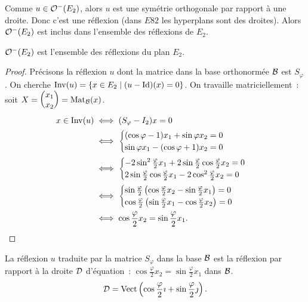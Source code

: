 Comme \(u \in \mathcal{O}^{-}\!\left(E_2\right)\), alors \(u\) est une symétrie orthogonale par 
rapport à une droite. Donc c'est une réflexion (dans \(E82\) les hyperplans 
sont des droites). Alors \(\mathcal{O}^{-}\!\left(E_2\right)\) est inclus dans l'ensemble des 
réflexions de \(E_2\).

\begin{theo}
  \(\mathcal{O}^{-}\!\left(E_2\right)\) est l'ensemble des réflexions du plan \(E_2\).
\end{theo}
\begin{proof}
  Précisons la réflexion \(u\) dont la matrice dans la base orthonormée 
  \(\mathcal{B}\) est \(S_\varphi\). On cherche \(\operatorname{Inv}(u)=\left\{x \in 
  E_2\mathrel{}\middle|\mathrel{}(u-\operatorname{Id})(x)=0\right\}\). On travaille matriciellement~: soit 
  \(X=\begin{pmatrix} x_1 \\ x_2 \end{pmatrix}=\mathrm{Mat}_{\mathcal{B}}(x)\).
    \begin{align*}
      x \in \operatorname{Inv}(u) &\iff (S_\varphi-I_2)x=0 \\
      &\iff \begin{cases} (\cos \varphi -1)x_1 +\sin\varphi x_2 = 0 \\ 
      \sin\varphi x_1 -(\cos\varphi+1)x_2=0 \end{cases} \\
      &\iff \begin{cases} -2\sin^2\frac{\varphi}{2}x_1 
        +2\sin\frac{\varphi}{2}\cos\frac{\varphi}{2} x_2 = 0 \\ 
        2\sin\frac{\varphi}{2}\cos\frac{\varphi}{2} x_1 - 
      2\cos^2\frac{\varphi}{2}x_2 = 0 \end{cases} \\
      &\iff \begin{cases} \sin\frac{\varphi}{2} 
        \left(\cos\frac{\varphi}{2}x_2 - \sin\frac{\varphi}{2}x_1\right) = 0 
        \\ \cos\frac{\varphi}{2} \left(\sin\frac{\varphi}{2}x_1 - 
      \cos\frac{\varphi}{2}x_2\right) = 0\end{cases} \\
      &\iff \cos\frac{\varphi}{2} x_2 = \sin\frac{\varphi}{2}x_1.
    \end{align*}
\end{proof}
\begin{prop}
  La réflexion \(u\) traduite par la matrice \(S_\varphi\) dans la base 
  \(\mathcal{B}\) est la réflexion par rapport à la droite \(\mathcal{D}\) d'équation~: 
  \(\cos\frac{\varphi}{2} x_2 = \sin\frac{\varphi}{2}x_1\) dans \(\mathcal{B}\).
  \begin{equation}
    \mathcal{D} = \operatorname{Vect}\left(\cos\frac{\varphi}{2}\imath + 
    \sin\frac{\varphi}{2}\jmath\right).
  \end{equation}
\end{prop}

